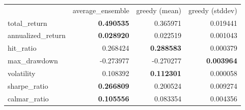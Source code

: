 \begin{tabular}{lrrr}
 & average_ensemble & greedy (mean) & greedy (stddev) \\
total_return & \bfseries 0.490535 & 0.365971 & 0.019441 \\
annualized_return & \bfseries 0.028920 & 0.022519 & 0.001043 \\
hit_ratio & 0.268424 & \bfseries 0.288583 & 0.000379 \\
max_drawdown & -0.273977 & -0.270277 & \bfseries 0.003964 \\
volatility & 0.108392 & \bfseries 0.112301 & 0.000058 \\
sharpe_ratio & \bfseries 0.266809 & 0.200524 & 0.009274 \\
calmar_ratio & \bfseries 0.105556 & 0.083354 & 0.004356 \\
\end{tabular}
